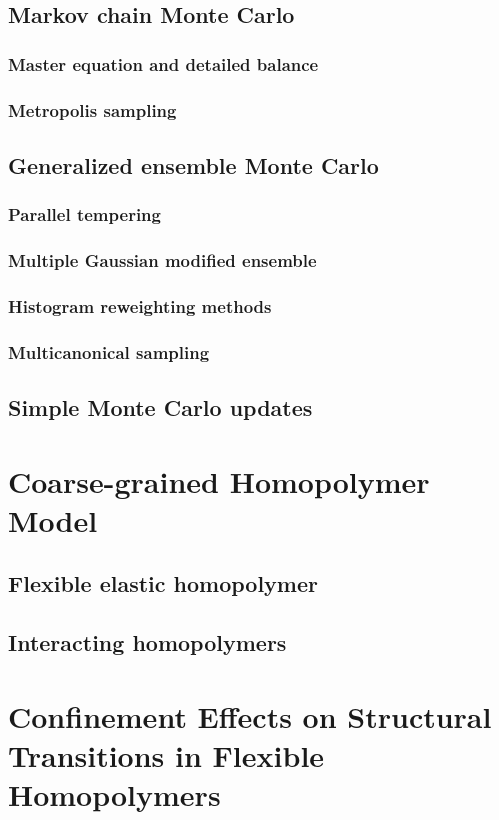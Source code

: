 \documentclass[12pt]{report}
\begin{document}
\section{Markov chain Monte Carlo}
\subsection{Master equation and detailed balance}
\subsection{Metropolis sampling}
\section{Generalized ensemble Monte Carlo}
\subsection{Parallel tempering}
\subsection{Multiple Gaussian modified ensemble}
\subsection{Histogram reweighting methods}
\subsection{Multicanonical sampling}
\section{Simple Monte Carlo updates}

\chapter{Coarse-grained Homopolymer Model}
\section{Flexible elastic homopolymer}
\section{Interacting homopolymers}

\chapter{Confinement Effects on Structural Transitions in Flexible Homopolymers}
\end{document}

